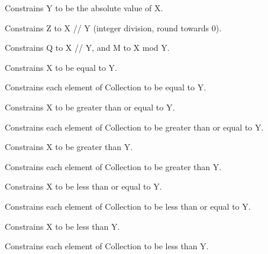 \begin{description}
\item[]
Constrains Y to be the absolute value of X.

\item[]
Constrains Z to X // Y (integer division, round towards 0).

\item[]
Constrains Q to X // Y, and M to X mod Y.

\item[]
Constrains X to be equal to Y.

\item[]
Constrains each element of Collection to be equal to Y.

\item[]
Constrains X to be greater than or equal to Y.

\item[]
Constrains each element of Collection to be greater than or equal to Y.

\item[]
Constrains X to be greater than Y.

\item[]
Constrains each element of Collection to be greater than Y.

\item[]
Constrains X to be less than or equal to Y.

\item[]
Constrains each element of Collection to be less than or equal to Y.

\item[]
Constrains X to be less than Y.

\item[]
Constrains each element of Collection to be less than Y.


\end{description}
